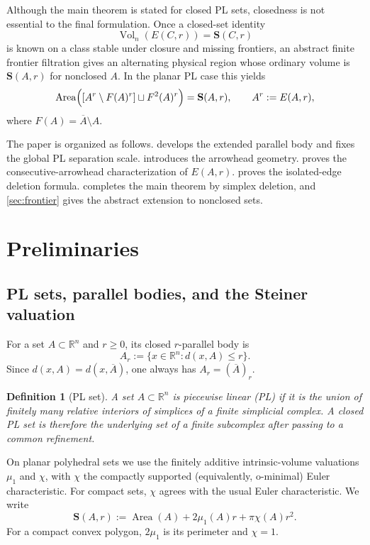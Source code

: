 \documentclass[11pt]{article}
\newtheorem{definition}[theorem]{Definition}
\newcommand{\R}{\mathbb R}
\newcommand{\Area}{\operatorname{Area}}
\newcommand{\Vol}{\operatorname{Vol}}
\newcommand{\Steiner}{\mathbf S}
\numberwithin{equation}{section}
\begin{document}
Although the main theorem is stated for closed PL sets, closedness is not essential to the final formulation. Once a closed-set identity
\[
\Vol_n(E(C,r))=\Steiner(C,r)
\]
is known on a class stable under closure and missing frontiers, an abstract finite frontier filtration gives an alternating physical region whose ordinary volume is $\Steiner(A,r)$ for nonclosed $A$. In the planar PL case this yields
\[
\Area\Bigl([A^r\setminus F(A)^r]\sqcup F^2(A)^r\Bigr)
=
\Steiner(A,r),
\qquad A^r:=E(A,r),
\]
where $F(A)=\overline A\setminus A$.

The paper is organized as follows.  develops the extended parallel body and fixes the global PL separation scale.  introduces the arrowhead geometry.  proves the consecutive-arrowhead characterization of $E(A,r)$.  proves the isolated-edge deletion formula.  completes the main theorem by simplex deletion, and \cref{sec:frontier} gives the abstract extension to nonclosed sets.
 \section{Preliminaries}\label{sec:prelim}

\subsection{PL sets, parallel bodies, and the Steiner valuation}

For a set $A\subset\R^n$ and $r\ge0$, its closed $r$-parallel body is
\[
A_r:=\{x\in\R^n:d(x,A)\le r\}.
\]
Since $d(x,A)=d(x,\overline A)$, one always has $A_r=(\overline A)_r$.

\begin{definition}[PL set]\label{def:pl-set}
A set $A\subset\R^n$ is \emph{piecewise linear} (PL) if it is the union of finitely many relative interiors of simplices of a finite simplicial complex. A closed PL set is therefore the underlying set of a finite subcomplex after passing to a common refinement.
\end{definition}

On planar polyhedral sets we use the finitely additive intrinsic-volume valuations $\mu_1$ and $\chi$, with $\chi$ the compactly supported (equivalently, o-minimal) Euler characteristic. For compact sets, $\chi$ agrees with the usual Euler characteristic. We write
\begin{equation}\label{eq:steiner-polynomial}
\Steiner(A,r):=\Area(A)+2\mu_1(A)r+\pi\chi(A)r^2.
\end{equation}
For a compact convex polygon, $2\mu_1$ is its perimeter and $\chi=1$.
\end{document}
